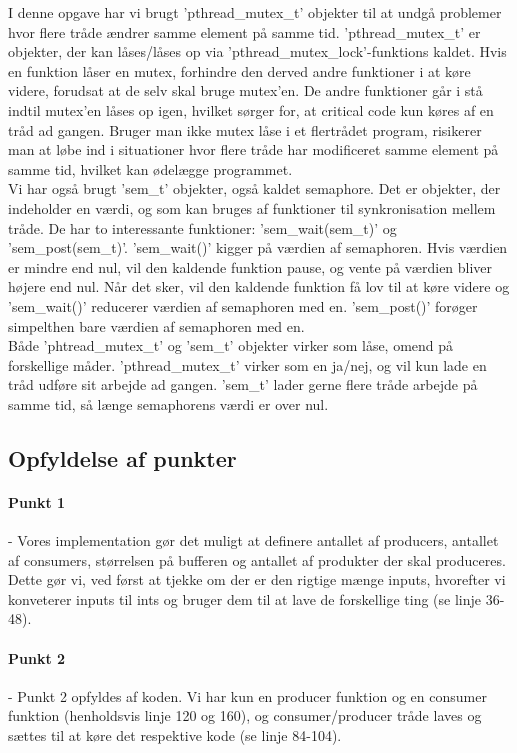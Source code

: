 I denne opgave har vi brugt 'pthread\_mutex\_t' objekter til at undgå problemer hvor flere tråde ændrer samme element på samme tid. 'pthread\_mutex\_t' er objekter, der kan låses/låses op via 'pthread\_mutex\_lock'-funktions kaldet. Hvis en funktion låser en mutex, forhindre den derved andre funktioner i at køre videre, forudsat at de selv skal bruge mutex'en. De andre funktioner går i stå indtil mutex'en låses op igen, hvilket sørger for, at critical code kun køres af en tråd ad gangen. Bruger man ikke mutex låse i et flertrådet program, risikerer man at løbe ind i situationer hvor flere tråde har modificeret samme element på samme tid, hvilket kan ødelægge programmet.
\\ Vi har også brugt 'sem\_t' objekter, også kaldet semaphore. Det er objekter, der indeholder en værdi, og som kan bruges af funktioner til synkronisation mellem tråde. De har to interessante funktioner: 'sem\_wait(sem\_t)' og 'sem\_post(sem\_t)'. 'sem\_wait()' kigger på værdien af semaphoren. Hvis værdien er mindre end nul, vil den kaldende funktion pause, og vente på værdien bliver højere end nul. Når det sker, vil den kaldende funktion få lov til at køre videre og 'sem\_wait()' reducerer værdien af semaphoren med en. 'sem\_post()' forøger simpelthen bare værdien af semaphoren med en.
\\ Både 'phtread\_mutex\_t' og 'sem\_t' objekter virker som låse, omend på forskellige måder. 'pthread\_mutex\_t' virker som en ja/nej, og vil kun lade en tråd udføre sit arbejde ad gangen. 'sem\_t' lader gerne flere tråde arbejde på samme tid, så længe semaphorens værdi er over nul.

\subsection{Opfyldelse af punkter}
\label{O3_Punkter}
\paragraph{Punkt 1} - Vores implementation gør det muligt at definere antallet af producers, antallet af consumers, størrelsen på bufferen og antallet af produkter der skal produceres. Dette gør vi, ved først at tjekke om der er den rigtige mænge inputs, hvorefter vi konveterer inputs til ints og bruger dem til at lave de forskellige ting (se linje 36-48).
\paragraph{Punkt 2} - Punkt 2 opfyldes af koden. Vi har kun en producer funktion og en consumer funktion (henholdsvis linje 120 og 160), og consumer/producer tråde laves og sættes til at køre det respektive kode (se linje 84-104).
